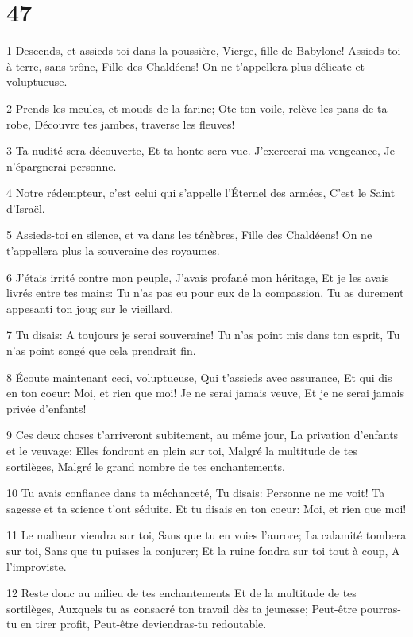 \chapter{47}

\par 1 Descends, et assieds-toi dans la poussière, Vierge, fille de Babylone! Assieds-toi à terre, sans trône, Fille des Chaldéens! On ne t'appellera plus délicate et voluptueuse.
\par 2 Prends les meules, et mouds de la farine; Ote ton voile, relève les pans de ta robe, Découvre tes jambes, traverse les fleuves!
\par 3 Ta nudité sera découverte, Et ta honte sera vue. J'exercerai ma vengeance, Je n'épargnerai personne. -
\par 4 Notre rédempteur, c'est celui qui s'appelle l'Éternel des armées, C'est le Saint d'Israël. -
\par 5 Assieds-toi en silence, et va dans les ténèbres, Fille des Chaldéens! On ne t'appellera plus la souveraine des royaumes.
\par 6 J'étais irrité contre mon peuple, J'avais profané mon héritage, Et je les avais livrés entre tes mains: Tu n'as pas eu pour eux de la compassion, Tu as durement appesanti ton joug sur le vieillard.
\par 7 Tu disais: A toujours je serai souveraine! Tu n'as point mis dans ton esprit, Tu n'as point songé que cela prendrait fin.
\par 8 Écoute maintenant ceci, voluptueuse, Qui t'assieds avec assurance, Et qui dis en ton coeur: Moi, et rien que moi! Je ne serai jamais veuve, Et je ne serai jamais privée d'enfants!
\par 9 Ces deux choses t'arriveront subitement, au même jour, La privation d'enfants et le veuvage; Elles fondront en plein sur toi, Malgré la multitude de tes sortilèges, Malgré le grand nombre de tes enchantements.
\par 10 Tu avais confiance dans ta méchanceté, Tu disais: Personne ne me voit! Ta sagesse et ta science t'ont séduite. Et tu disais en ton coeur: Moi, et rien que moi!
\par 11 Le malheur viendra sur toi, Sans que tu en voies l'aurore; La calamité tombera sur toi, Sans que tu puisses la conjurer; Et la ruine fondra sur toi tout à coup, A l'improviste.
\par 12 Reste donc au milieu de tes enchantements Et de la multitude de tes sortilèges, Auxquels tu as consacré ton travail dès ta jeunesse; Peut-être pourras-tu en tirer profit, Peut-être deviendras-tu redoutable.

